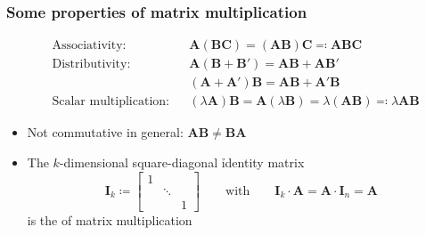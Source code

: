 \documentclass[t]{beamer} %
\begin{document}
\begin{frame}
  \frametitle{Some properties of matrix multiplication}

  \ungap[1]
  \begin{align*}
    &\text{Associativity:}
    && \mathbf{A}(\mathbf{BC}) = (\mathbf{AB})\mathbf{C} \eqcolon \mathbf{ABC} \\
    &\text{Distributivity:}
    && \mathbf{A}(\mathbf{B} + \mathbf{B'}) = \mathbf{AB} + \mathbf{AB'}\\
    &&& (\mathbf{A} + \mathbf{A'})\mathbf{B} = \mathbf{AB} + \mathbf{A'B}\\
    &\text{Scalar multiplication:}
    && (\lambda \mathbf{A})\mathbf{B} = \mathbf{A}(\lambda \mathbf{B}) = \lambda (\mathbf{AB}) \eqcolon \lambda \mathbf{AB}
  \end{align*}

  \begin{itemize}
  \item Not commutative in general: $\mathbf{A} \mathbf{B} \neq \mathbf{B} \mathbf{A}$
  \item<2-> The $k$-dimensional square-diagonal \h{identity matrix}
    \[
    \mathbf{I}_k \coloneq
    \begin{bmatrix}
      1 & & \\
      & \ddots & \\
      & & 1
    \end{bmatrix}
    \qquad \text{with} \qquad
     \mathbf{I}_k\cdot \mathbf{A} = \mathbf{A}\cdot \mathbf{I}_n = \mathbf{A}
    \]
    is the  of matrix multiplication
  \end{itemize}
\end{frame}
\end{document}
